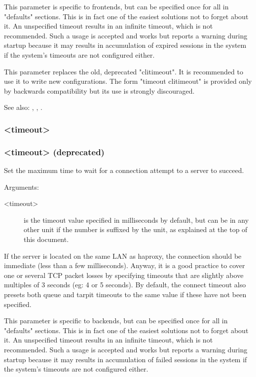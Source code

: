   This parameter is specific to frontends, but can be specified once for all in
  "defaults" sections. This is in fact one of the easiest solutions not to
  forget about it. An unspecified timeout results in an infinite timeout, which
  is not recommended. Such a usage is accepted and works but reports a warning
  during startup because it may results in accumulation of expired sessions in
  the system if the system's timeouts are not configured either.

  This parameter replaces the old, deprecated "clitimeout". It is recommended
  to use it to write new configurations. The form "timeout clitimeout" is
  provided only by backwards compatibility but its use is strongly discouraged.


See also: , , .

\subsubsection[timeout connect]{ <timeout>}
\subsubsection[timeout contimeout]{ <timeout> (deprecated)}

  Set the maximum time to wait for a connection attempt to a server to succeed.


  Arguments:
  \begin{description}
  \item[<timeout>] is the timeout value specified in milliseconds by default, but
              can be in any other unit if the number is suffixed by the unit,
              as explained at the top of this document.
  \end{description}

  If the server is located on the same LAN as haproxy, the connection should be
  immediate (less than a few milliseconds). Anyway, it is a good practice to
  cover one or several TCP packet losses by specifying timeouts that are
  slightly above multiples of 3 seconds (eg: 4 or 5 seconds). By default, the
  connect timeout also presets both queue and tarpit timeouts to the same value
  if these have not been specified.

  This parameter is specific to backends, but can be specified once for all in
  "defaults" sections. This is in fact one of the easiest solutions not to
  forget about it. An unspecified timeout results in an infinite timeout, which
  is not recommended. Such a usage is accepted and works but reports a warning
  during startup because it may results in accumulation of failed sessions in
  the system if the system's timeouts are not configured either.

